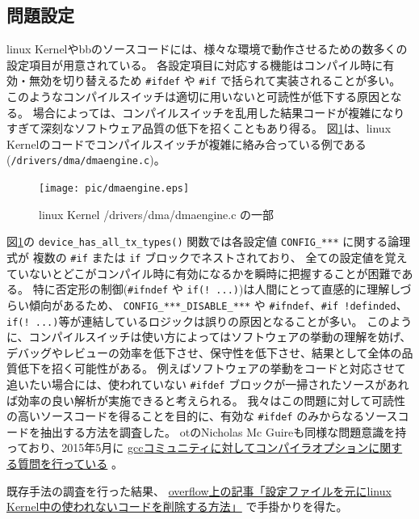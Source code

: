 \subsection{問題設定}
\acrshort{linux} Kernelや\acrshort{bb}のソースコードには、様々な環境で動作させるための数多くの設定項目が用意されている。
各設定項目に対応する機能はコンパイル時に有効・無効を切り替えるため \verb|#ifdef| や \verb|#if| で括られて実装されることが多い。
このようなコンパイルスイッチは適切に用いないと可読性が低下する原因となる。
場合によっては、コンパイルスイッチを乱用した結果コードが複雑になりすぎて深刻なソフトウェア品質の低下を招くこともあり得る。
図\ref{dmaengine}は、\acrshort{linux} Kernelのコードでコンパイルスイッチが複雑に絡み合っている例である(\verb|/drivers/dma/dmaengine.c|)。
\begin{figure}[ht]
  \centering
  \texttt{[image: pic/dmaengine.eps]}
  \caption{\acrshort{linux} Kernel /drivers/dma/dmaengine.c の一部}
  \label{dmaengine}
\end{figure}
\par
図\ref{dmaengine}の \verb|device_has_all_tx_types()| 関数では各設定値 \verb|CONFIG_***| に関する論理式が
複数の \verb|#if| または \verb|if| ブロックでネストされており、
全ての設定値を覚えていないとどこがコンパイル時に有効になるかを瞬時に把握することが困難である。
特に否定形の制御(\verb|#ifndef| や \verb|if(! ...)|)は人間にとって直感的に理解しづらい傾向があるため、
\verb|CONFIG_***_DISABLE_***| や \verb|#ifndef|、\verb|#if !definded|、\verb|if(! ...)|等が連結しているロジックは誤りの原因となることが多い。
このように、コンパイルスイッチは使い方によってはソフトウェアの挙動の理解を妨げ、デバッグやレビューの効率を低下させ、保守性を低下させ、結果として全体の品質低下を招く可能性がある。
例えばソフトウェアの挙動をコードと対応させて追いたい場合には、使われていない \verb|#ifdef| ブロックが一掃されたソースがあれば効率の良い解析が実施できると考えられる。
我々はこの問題に対して可読性の高いソースコードを得ることを目的に、有効な \verb|#ifdef| のみからなるソースコードを抽出する方法を調査した。
\acrshort{ot}のNicholas Mc Guireも同様な問題意識を持っており、2015年5月に
\href{https://gcc.gnu.org/ml/gcc-help/2015-05/msg00012.html}{\acrshort{gcc}コミュニティに対してコンパイラオプションに関する質問を行っている} \cite{fdirectives}。
\par
既存手法の調査を行った結果、
\href{http://stackoverflow.com/questions/7353640/strip-linux-kernel-sources-according-to-config}{\acrshort{overflow}上の記事「設定ファイルを元に\acrshort{linux} Kernel中の使われないコードを削除する方法」} \cite{overflow} で手掛かりを得た。
